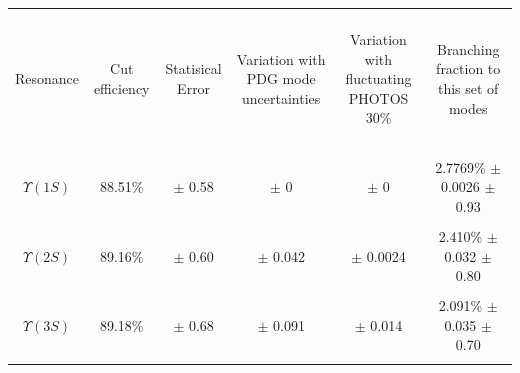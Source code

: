 \documentclass[landscape]{article}
\begin{document}
\begin{center}
  \begin{tabular}{c | c c c c | c}
    \hline\hline
    & & & & & \\
    \begin{minipage}{3 cm} \begin{center} Resonance \end{center} \end{minipage} &
    \begin{minipage}{2 cm} \begin{center} Cut efficiency \end{center} \end{minipage} &
    \begin{minipage}{2 cm} \begin{center} Statisical Error \end{center} \end{minipage} &
    \begin{minipage}{4 cm} \begin{center} Variation with PDG mode uncertainties \end{center} \end{minipage} &
    \begin{minipage}{4 cm} \begin{center} Variation with fluctuating PHOTOS 30\% \end{center} \end{minipage} &
    \begin{minipage}{3 cm} \begin{center} Branching fraction to this set of modes \end{center} \end{minipage} \\
    & & & & & \\\hline
    & & & & & \\
    $\Upsilon(1S)$ & 88.51\% & $\pm$ 0.58 & $\pm$ 0 & $\pm$ 0 & 2.7769\% $\pm$ 0.0026 {\color{blue} $\pm$ 0.93} \\
    & & & & & \\
    $\Upsilon(2S)$ & 89.16\% & $\pm$ 0.60 & $\pm$ 0.042 & $\pm$ 0.0024 & 2.410\% $\pm$ 0.032 {\color{blue} $\pm$ 0.80} \\
    & & & & & \\
    $\Upsilon(3S)$ & 89.18\% & $\pm$ 0.68 & $\pm$ 0.091 & $\pm$ 0.014 & 2.091\% $\pm$ 0.035 {\color{blue} $\pm$ 0.70} \\
    & & & & & \\\hline\hline
  \end{tabular}
\end{center}
\end{document}
